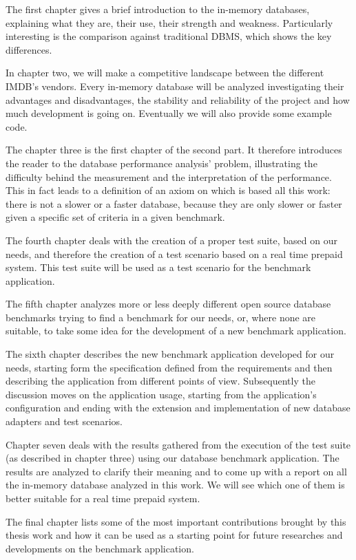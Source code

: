 The first chapter gives a brief introduction to the in-memory databases, explaining what they are, their use, their strength and weakness. Particularly interesting is the comparison against traditional DBMS, which shows the key differences. 

In chapter two, we will make a competitive landscape between the different IMDB's vendors. Every in-memory database will be analyzed investigating their advantages and disadvantages, the stability and reliability of the project and how much development is going on. Eventually we will also provide some example code.

The chapter three is the first chapter of the second part. It therefore introduces the reader to the database performance analysis' problem, illustrating the difficulty behind the measurement and the interpretation of the performance. This in fact leads to a definition of an axiom on which is based all this work: there is not a slower or a faster database, because they are only slower or faster given a specific set of criteria in a given benchmark.

The fourth chapter deals with the creation of a proper test suite, based on our needs, and therefore the creation of a test scenario based on a real time prepaid system. This test suite will be used as a test scenario for the benchmark application.

The fifth chapter analyzes more or less deeply different open source database benchmarks trying to find a benchmark for our needs, or, where none are suitable, to take some idea for the development of a new benchmark application.

The sixth chapter describes the new benchmark application developed for our needs, starting form the specification defined from the requirements and then describing the application from different points of view. Subsequently the discussion moves on the application usage, starting from the application's configuration and ending with the extension and implementation of new database adapters and test scenarios.

Chapter seven deals with the results gathered from the execution of the test suite (as described in chapter three) using our database benchmark application. The results are analyzed to clarify their meaning and to come up with a report on all the in-memory database analyzed in this work. We will see which one of them is better suitable for a real time prepaid system.

The final chapter lists some of the most important contributions brought by this thesis work and how it can be used as a starting point for future researches and developments on the benchmark application.